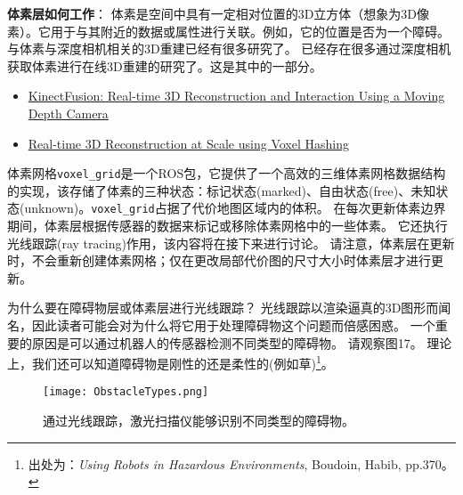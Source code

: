\textbf{体素层如何工作}：
体素是空间中具有一定相对位置的3D立方体（想象为3D像素）。它用于与其附近的数据或属性进行关联。例如，它的位置是否为一个障碍。
与体素与深度相机相关的3D重建已经有很多研究了。
已经存在很多通过深度相机获取体素进行在线3D重建的研究了。这是其中的一部分。

\begin{itemize}
	\item \href{http://delivery.acm.org/10.1145/2050000/2047270/p559-izadi.pdf?ip=128.208.7.188&id=2047270&acc=ACTIVE\%20SERVICE&key=B63ACEF81C6334F5\%2EF43F328D6C8418D0\%2E4D4702B0C3E38B35\%2E4D4702B0C3E38B35&CFID=830915711&CFTOKEN=23054788&__acm__=1472349664_9fd28ae246d72a507f6a93c5ac84a516}{KinectFusion: Real-time 3D Reconstruction and Interaction Using a Moving Depth Camera} 
	\item \href{https://people.mpi-inf.mpg.de/~mzollhoef/Papers/SGASIA2013_VH/paper.pdf}{Real-time 3D Reconstruction at Scale using Voxel Hashing}
\end{itemize}

体素网格\texttt{voxel_grid}是一个ROS包，它提供了一个高效的三维体素网格数据结构的实现，该存储了体素的三种状态：标记状态(marked)、自由状态(free)、未知状态(unknown)。\texttt{voxel_grid}占据了代价地图区域内的体积。
在每次更新体素边界期间，体素层根据传感器的数据来标记或移除体素网格中的一些体素。
它还执行光线跟踪(ray tracing)作用，该内容将在接下来进行讨论。
请注意，体素层在更新时，不会重新创建体素网格；仅在更改局部代价图的尺寸大小时体素层才进行更新。

为什么要在障碍物层或体素层进行光线跟踪？
光线跟踪以渲染逼真的3D图形而闻名，因此读者可能会对为什么将它用于处理障碍物这个问题而倍感困惑。
一个重要的原因是可以通过机器人的传感器检测不同类型的障碍物。
请观察图17。
理论上，我们还可以知道障碍物是刚性的还是柔性的(例如草)\footnote{出处为：\textit{Using Robots in Hazardous Environments}, Boudoin, Habib, pp.370。}。

\begin{figure}[!h]
	\begin{center}
		\texttt{[image: ObstacleTypes.png]}
		\caption{通过光线跟踪，激光扫描仪能够识别不同类型的障碍物。}
	\end{center}
\end{figure}

